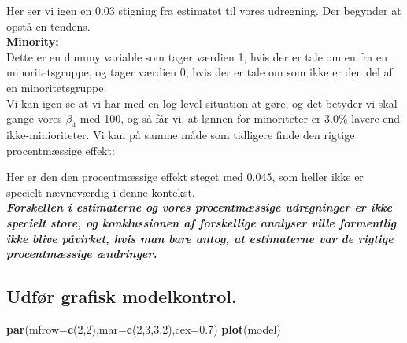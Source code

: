 \documentclass[
  10pt,
]{article}
\newenvironment{Shaded}{\begin{snugshade}}{\end{snugshade}}
\newcommand{\CommentTok}[1]{\textcolor[rgb]{0.56,0.35,0.01}{\textit{#1}}}
\newcommand{\DataTypeTok}[1]{\textcolor[rgb]{0.13,0.29,0.53}{#1}}
\newcommand{\DecValTok}[1]{\textcolor[rgb]{0.00,0.00,0.81}{#1}}
\newcommand{\FloatTok}[1]{\textcolor[rgb]{0.00,0.00,0.81}{#1}}
\newcommand{\KeywordTok}[1]{\textcolor[rgb]{0.13,0.29,0.53}{\textbf{#1}}}
\newcommand{\NormalTok}[1]{#1}
\newcommand{\OperatorTok}[1]{\textcolor[rgb]{0.81,0.36,0.00}{\textbf{#1}}}
\begin{document}
Her ser vi igen en 0.03 stigning fra estimatet til vores udregning. Der
begynder at opstå en tendens.\\

\textbf{Minority:}\\
Dette er en dummy variable som tager værdien 1, hvis der er tale om en
fra en minoritetsgruppe, og tager værdien 0, hvis der er tale om som
ikke er den del af en minoritetsgruppe.\\
Vi kan igen se at vi har med en log-level situation at gøre, og det
betyder vi skal gange vores \(β_4\) med 100, og så får vi, at lønnen for
minoriteter er 3.0\% lavere end ikke-minioriteter. Vi kan på samme måde
som tidligere finde den rigtige procentmæssige effekt:

\begin{Shaded}
\end{Shaded}

Her er den den procentmæssige effekt steget med 0.045, som heller ikke
er specielt nævneværdig i denne kontekst.\\
\textbf{\textit{Forskellen i estimaterne og vores procentmæssige udregninger er ikke specielt store, og konklussionen af forskellige analyser ville formentlig ikke blive påvirket, hvis man bare antog, at estimaterne var de rigtige procentmæssige ændringer.}}

\hypertarget{udfuxf8r-grafisk-modelkontrol.}{%
\subsection{Udfør grafisk
modelkontrol.}\label{udfuxf8r-grafisk-modelkontrol.}}

\begin{Shaded}
\begin{Highlighting}[]
\KeywordTok{par}\NormalTok{(}\DataTypeTok{mfrow=}\KeywordTok{c}\NormalTok{(}\DecValTok{2}\NormalTok{,}\DecValTok{2}\NormalTok{),}\DataTypeTok{mar=}\KeywordTok{c}\NormalTok{(}\DecValTok{2}\NormalTok{,}\DecValTok{3}\NormalTok{,}\DecValTok{3}\NormalTok{,}\DecValTok{2}\NormalTok{),}\DataTypeTok{cex=}\FloatTok{0.7}\NormalTok{)}
\KeywordTok{plot}\NormalTok{(model)}
\end{Highlighting}
\end{Shaded}
\end{document}
